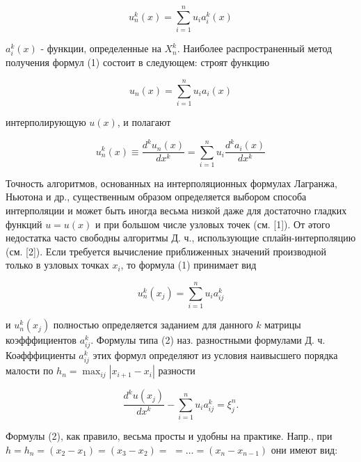 \documentclass[10pt]{article}
\begin{document}
\[

u_{n}^{k}(x)=\sum_{i=1}^{n} u_{i} a_{i}^{k}(x)

\]



$a_{i}^{k}(x)$ - функции, определенные на $X_{n}^{k}$. Наиболее распространенный метод получения формул (1) состоит в следующем: строят функцию



\[

u_{n}(x)=\sum_{i=1}^{n} u_{i} a_{i}(x)

\]



интерполирующую $u(x)$, и полагают



\[

u_{n}^{k}(x) \equiv \frac{d^{k} u_{n}(x)}{d x^{k}}=\sum_{i=1}^{n} u_{i} \frac{d^{k} a_{i}(x)}{d x^{k}}

\]



Точность алгоритмов, основанных на интерполяционных формулах Лагранжа, Ньютона и др., существенным образом определяется выбором способа интерполяции и может быть иногда весьма низкой даже для достаточно гладких функций $u=u(x)$ и при большом числе узловых точек (см. [1]). От әтого недостатка часто свободны алгоритмы Д. ч., использующие сплайн-интерполяцию (см. [2]). Если требуется вычисление приближенных значений производной только в узловых точках $x_{i}$, то формула (1) принимает вид



\[

u_{n}^{k}\left(x_{j}\right)=\sum_{i=1}^{n} u_{i} a_{i j}^{k}

\]



и $u_{n}^{k}\left(x_{j}\right)$ полностью определяется заданием для данного $k$ матрицы коэфффициентов $a_{i j}^{k}$. Формулы типа (2) наз. разностными формулами Д. ч. Коәфффициенты $a_{i j}^{k}$ этих формул определяют из условия наивысшего порядка малости по $h_{n}=\max _{i j}\left|x_{i+1}-x_{i}\right|$ разности



\[

\frac{d^{k} u\left(x_{j}\right)}{d x^{k}}-\sum_{i=1}^{n} u_{i} a_{i j}^{k}=\xi_{j}^{n} .

\]



Формулы (2), как правило, весьма просты и удобны на практике. Напр., при $h=h_{n}=\left(x_{2}-x_{1}\right)=\left(x_{3}-x_{2}\right)=$ $=\ldots=\left(x_{n}-x_{n-1}\right)$ они имеют вид:
\end{document}
